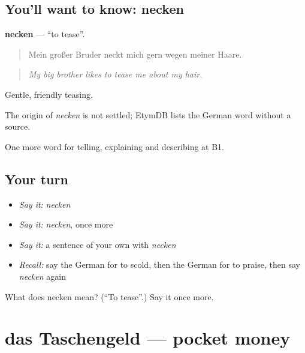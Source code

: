 \subsection*{You'll want to know: necken}
\textbf{necken} — \textquotedblleft{}to tease\textquotedblright{}.

\begin{quote}
Mein großer Bruder neckt mich gern wegen meiner Haare.
\end{quote}

\begin{quote}
\emph{My big brother likes to tease me about my hair.}
\end{quote}

Gentle, friendly teasing.

\begin{cousinweb}
The origin of \emph{necken} is not settled; EtymDB lists the German word without a source.
\end{cousinweb}

\begin{grammarlens}[title={What you've built}]
One more word for telling, explaining and describing at B1.
\end{grammarlens}

\subsection*{Your turn}
\begin{itemize}
\raggedright
  \item \emph{Say it:} \emph{necken}
  \item \emph{Say it:} \emph{necken}, once more
  \item \emph{Say it:} a sentence of your own with \emph{necken}
  \item \emph{Recall:} say the German for to scold, then the German for to praise, then say \emph{necken} again
\end{itemize}

\begin{tcolorbox}[breakable,colback=teal!4,colframe=teal!35!black,title={Before you move on}]
What does necken mean? (\textquotedblleft{}To tease\textquotedblright{}.) Say it once more.
\end{tcolorbox}
\section[das Taschengeld]{das Taschengeld — pocket money}

\label{lesson:GE-C497-taschengeld}



